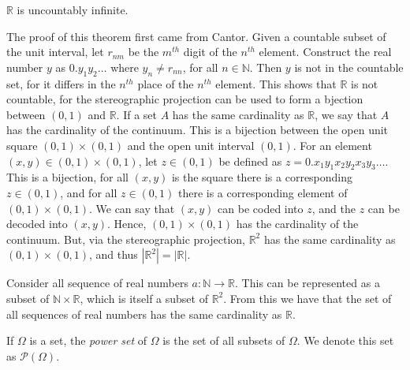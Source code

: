 \documentclass[crop=false,class=book,oneside]{standalone}
\begin{document}
            \begin{theorem}
                $\mathbb{R}$ is uncountably infinite.
            \end{theorem}
            The proof of this theorem first came from Cantor.
            Given a countable subset of the unit interval, let
            $r_{nm}$ be the $m^{th}$ digit of the $n^{th}$ element.
            Construct the real number $y$ as
            $0.y_{1}y_{2}\hdots$ where $y_{n}\ne{r}_{nn}$, for
            all $n\in\mathbb{N}$. Then $y$ is not in the countable
            set, for it differs in the $n^{th}$ place of the
            $n^{th}$ element. This shows that $\mathbb{R}$ is
            not countable, for the stereographic projection can be
            used to form a bjection between $(0,1)$ and $\mathbb{R}$.
            If a set $A$ has the same cardinality as $\mathbb{R}$,
            we say that $A$ has the cardinality of the
            continuum. This is a bijection between the open unit
            square $(0,1)\times(0,1)$ and the open unit interval
            $(0,1)$. For an element $(x,y)\in(0,1)\times(0,1)$,
            let $z\in(0,1)$ be defined as
            $z=0.x_{1}y_{1}x_{2}y_{2}x_{3}y_{3}\hdots$. This is
            a bijection, for all $(x,y)$ is the square there is
            a corresponding $z\in(0,1)$, and for all
            $z\in(0,1)$ there is a corresponding element of
            $(0,1)\times(0,1)$. We can say that $(x,y)$ can
            be coded into $z$, and the $z$ can be decoded into
            $(x,y)$. Hence, $(0,1)\times(0,1)$ has the cardinality
            of the continuum. But, via the stereographic projection,
            $\mathbb{R}^{2}$ has the same cardinality as
            $(0,1)\times(0,1)$, and thus
            $|\mathbb{R}^{2}|=|\mathbb{R}|$.
            \begin{lexample}
                Consider all sequence of real numbers
                $a:\mathbb{N}\rightarrow\mathbb{R}$. This can be
                represented as a subset of
                $\mathbb{N}\times\mathbb{R}$, which is itself
                a subset of $\mathbb{R}^{2}$. From this we have
                that the set of all sequences of real numbers has
                the same cardinality as $\mathbb{R}$.
            \end{lexample}
            If $\Omega$ is a set, the \textit{power set} of
            $\Omega$ is the set of all subsets of $\Omega$.
            We denote this set as $\mathcal{P}(\Omega)$.
\end{document}

